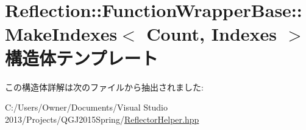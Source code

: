 \hypertarget{struct_reflection_1_1_function_wrapper_base_1_1_make_indexes}{}\section{Reflection\+:\+:Function\+Wrapper\+Base\+:\+:Make\+Indexes$<$ Count, Indexes $>$ 構造体テンプレート}
\label{struct_reflection_1_1_function_wrapper_base_1_1_make_indexes}


この構造体詳解は次のファイルから抽出されました\+:\begin{DoxyCompactItemize}
\item 
C\+:/\+Users/\+Owner/\+Documents/\+Visual Studio 2013/\+Projects/\+Q\+G\+J2015\+Spring/\hyperlink{_reflector_helper_8hpp}{Reflector\+Helper.\+hpp}\end{DoxyCompactItemize}
